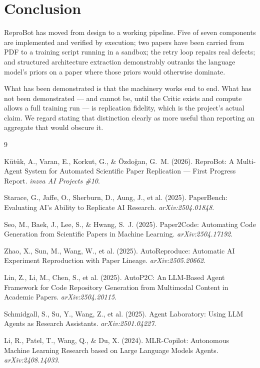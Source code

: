 \documentclass[10pt,twocolumn]{article}
\begin{document}
\section{Conclusion}
\label{sec:conclusion}

ReproBot has moved from design to a working pipeline. Five of seven components are
implemented and verified by execution; two papers have been carried from PDF to a
training script running in a sandbox; the retry loop repairs real defects; and structured
architecture extraction demonstrably outranks the language model's priors on a paper
where those priors would otherwise dominate.

What has been demonstrated is that the machinery works end to end. What has not been
demonstrated --- and cannot be, until the Critic exists and compute allows a full training
run --- is replication fidelity, which is the project's actual claim. We regard stating
that distinction clearly as more useful than reporting an aggregate that would obscure it.


\begin{thebibliography}{9}

Kütük, A., Varan, E., Korkut, G., \& Özdoğan, G.~M. (2026).
ReproBot: A Multi-Agent System for Automated Scientific Paper Replication --- First
Progress Report. \textit{inzva AI Projects \#10}.

Starace, G., Jaffe, O., Sherburn, D., Aung, J., et al. (2025).
PaperBench: Evaluating AI's Ability to Replicate AI Research.
\textit{arXiv:2504.01848}.

Seo, M., Baek, J., Lee, S., \& Hwang, S.~J. (2025).
Paper2Code: Automating Code Generation from Scientific Papers in Machine Learning.
\textit{arXiv:2504.17192}.

Zhao, X., Sun, M., Wang, W., et al. (2025).
AutoReproduce: Automatic AI Experiment Reproduction with Paper Lineage.
\textit{arXiv:2505.20662}.

Lin, Z., Li, M., Chen, S., et al. (2025).
AutoP2C: An LLM-Based Agent Framework for Code Repository Generation from Multimodal
Content in Academic Papers. \textit{arXiv:2504.20115}.

Schmidgall, S., Su, Y., Wang, Z., et al. (2025).
Agent Laboratory: Using LLM Agents as Research Assistants.
\textit{arXiv:2501.04227}.

Li, R., Patel, T., Wang, Q., \& Du, X. (2024).
MLR-Copilot: Autonomous Machine Learning Research based on Large Language Models Agents.
\textit{arXiv:2408.14033}.

\end{thebibliography}
\end{document}
